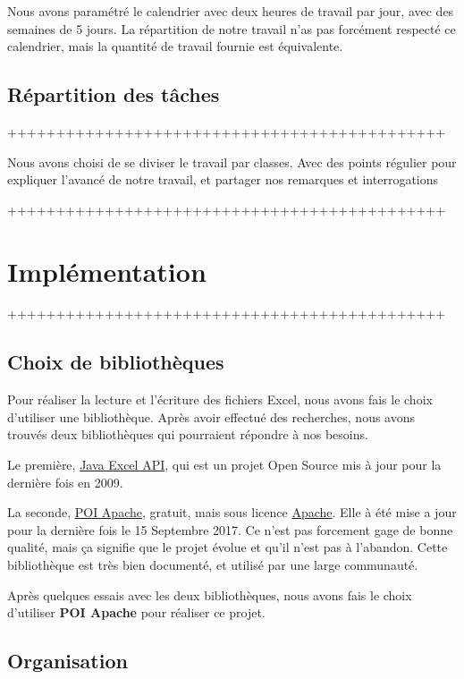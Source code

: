 \documentclass{polytech/polytech}
\begin{document}
	Nous avons paramétré le calendrier avec deux heures de travail par jour, avec des semaines de 5 jours.
	La répartition de notre travail n'as pas forcément respecté ce calendrier, mais la quantité de travail fournie est équivalente.

	\section{Répartition des tâches}
	+++++++++++++++++++++++++++++++++++++++++++++

	Nous avons choisi de se diviser le travail par classes.
	Avec des points régulier pour expliquer l'avancé de notre travail, et partager nos remarques et
	interrogations

	+++++++++++++++++++++++++++++++++++++++++++++

	\chapter{Implémentation}

	+++++++++++++++++++++++++++++++++++++++++++++

	\section{Choix de bibliothèques}

	Pour réaliser la lecture et l'écriture des fichiers Excel, nous avons fais le choix d'utiliser une bibliothèque.
	Après avoir effectué des recherches, nous avons trouvés deux bibliothèques qui pourraient répondre à nos besoins.

	Le première, \href{http://jexcelapi.sourceforge.net/}{Java Excel API}, qui est un projet Open Source mis à jour pour la dernière fois en 2009.
	
	\label{lib}
	La seconde, \href{http://poi.apache.org}{POI Apache}, gratuit, mais sous licence \href{https://www.apache.org/licenses/}{Apache}.
	Elle à été mise a jour pour la dernière fois le 15 Septembre 2017.
	Ce n'est pas forcement gage de bonne qualité, mais ça signifie que le projet évolue et qu'il n'est pas à l'abandon.
	Cette bibliothèque est très bien documenté, et utilisé par une large communauté.

	Après quelques essais avec les deux bibliothèques, nous avons fais le choix d'utiliser \textbf{POI Apache} pour réaliser ce projet.

	\section{Organisation}
\end{document}
